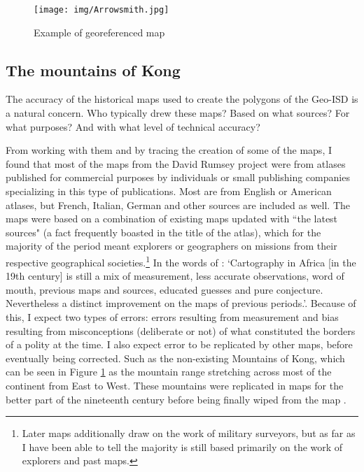 \documentclass[12pt]{article}
\begin{document}

\begin{figure}[h!tpb]
	\centering
	\texttt{[image: img/Arrowsmith.jpg]}
	\caption{Example of georeferenced map}%
	\label{Arrowsmith}
\end{figure}


\subsection{The mountains of Kong}

The accuracy of the historical maps used to create the polygons of the Geo-ISD
is a natural concern. Who typically drew these maps? Based on what sources? For
what purposes? And with what level of technical accuracy? 

From working with them and by tracing the creation of some of the maps, I found
that most of the maps from the David Rumsey project were from atlases published
for commercial purposes by individuals or small publishing companies
specializing in this type of publications. Most are from English or American
atlases, but French, Italian, German and other sources are included as well. The
maps were based on a combination of existing maps updated with ``the latest
sources" (a fact frequently boasted in the title of the atlas), which for the
majority of the period meant explorers or geographers on missions from their
respective geographical societies.\footnote{Later maps additionally draw on the
	work of military surveyors, but as far as I have been able to tell the
majority is still based primarily on the work of explorers and past maps.} In
the words of \citet[47-48]{Stone1995}: `Cartography in Africa [in the 19th
century] is still a mix of measurement, less accurate observations, word of
mouth, previous maps and sources, educated guesses and pure conjecture.
Nevertheless a distinct improvement on the maps of previous periods.'. Because
of this, I expect two types of errors: errors resulting from measurement and
bias resulting from misconceptions (deliberate or not) of what constituted the
borders of a polity at the time. I also expect error to be replicated by other
maps, before eventually being corrected. Such as the non-existing Mountains of
Kong, which can be seen in Figure \ref{Arrowsmith} as the mountain range
stretching across most of the continent from East to West. These mountains were
replicated in maps for the better part of the nineteenth century before being
finally wiped from the map \citep{Bassett_1991}.
\end{document}
